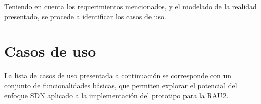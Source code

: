 
Teniendo en cuenta los requerimientos mencionados, y el modelado de la realidad presentado, se procede a identificar los casos de uso. 

\section[Casos de uso]{Casos de uso}
\label{section5.3}

La lista de casos de uso presentada a continuaci\'on se corresponde con un conjunto de funcionalidades b\'asicas, que permiten explorar el potencial del enfoque SDN aplicado a la implementaci\'on del prototipo para la RAU2.\\ 


